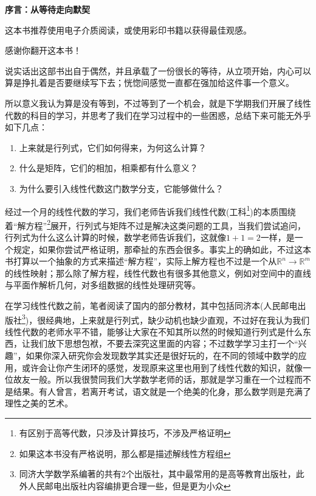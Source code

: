 
\frontmatter
\thispagestyle{empty}
\newpage
\begin{center}
	\textbf{\LARGE 序言：从等待走向默契}
\end{center}

\vspace{2em}

这本书推荐使用电子介质阅读，或使用彩印书籍以获得最佳观感。

感谢你翻开这本书！

说实话出这部书出自于偶然，并且承载了一份很长的等待，从立项开始，内心可以算是挣扎着是否要继续写下去；恍惚间感觉一直都在强加给这件事一个意义。

所以意义我认为算是没有等到，不过等到了一个机会，就是下学期我们开展了线性代数的科目的学习，并思考了我们在学习过程中的一些困惑，总结下来可能无外乎如下几点：

\vspace{1em}

\begin{enumerate}
	\item 上来就是行列式，它们如何得来，为何这么计算？
	\item 什么是矩阵，它们的相加，相乘都有什么意义？
	\item 为什么要引入线性代数这门数学分支，它能够做什么？
\end{enumerate}

\vspace{1em}

经过一个月的线性代数的学习，我们老师告诉我们线性代数(工科\footnote{有区别于高等代数，只涉及计算技巧，不涉及严格证明})的本质围绕着``解方程''\footnote{如果这本书没有严格说明，那么都是描述解线性方程组}展开，行列式与矩阵不过是解决这类问题的工具，当我们尝试追问，行列式为什么这么计算的时候，数学老师告诉我们，这就像$1+1=2$一样，是一个规定，如果你尝试严格证明，那牵扯的东西会很多。事实上的确如此，不过这本书打算以一个抽象的方式来描述``解方程''，实际上解方程也不过是一个从$\mathbb{R}^n\rightarrow \mathbb{R}^m$的线性映射；那么除了解方程，线性代数也有很多其他意义，例如对空间中的直线与平面作解析几何，对多组数据的线性处理研究等。

在学习线性代数之前，笔者阅读了国内的部分教材，其中包括同济本(人民邮电出版社\footnote{同济大学数学系编著的共有2个出版社，其中最常用的是高等教育出版社，此外人民邮电出版社内容编排更合理一些，但是更为小众})，很经典地，上来就是行列式，缺少动机也缺少直观，不过好在我认为我们线性代数的老师水平不错，能够让大家在不知其所以然的时候知道行列式是什么东西，让我们放下思想包袱，不要去深究这里面的内容；不过数学学习主打一个``兴趣''，如果你深入研究你会发现数学其实还是很好玩的，在不同的领域中数学的应用，或许会让你产生闭环的感觉，发现原来这里也用到了线性代数的知识，就像一位故友一般。所以我很赞同我们大学数学老师的话，那就是学习重在一个过程而不是结果。有人曾言，若离开考试，语文就是一个绝美的化身，那么数学则是充满了理性之美的艺术。

